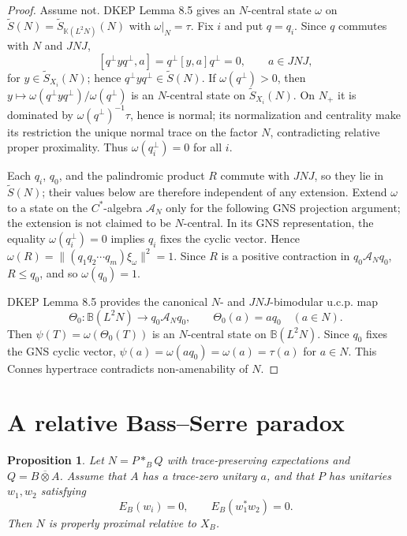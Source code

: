 \documentclass[12pt]{article}
\newtheorem{proposition}{Proposition}
\newcommand{\bbarotimes}{\mathbin{\overline{\otimes}}}
\newcommand{\cA}{\mathcal A}
\begin{document}
\begin{proof}
Assume not.  DKEP Lemma 8.5 gives an \(N\)-central state \(\omega\) on
\(\widetilde S(N)=\widetilde S_{\mathbb K(L^2N)}(N)\) with
\(\omega|_N=\tau\).  Fix \(i\) and put \(q=q_i\).  Since \(q\) commutes with
\(N\) and \(JNJ\),
\[
 [q^\perp yq^\perp,a]=q^\perp[y,a]q^\perp=0,\qquad a\in JNJ,
\]
for \(y\in\widetilde S_{X_i}(N)\); hence \(q^\perp yq^\perp\in\widetilde
S(N)\).  If \(\omega(q^\perp)>0\), then
\(y\mapsto \omega(q^\perp yq^\perp)/\omega(q^\perp)\) is an \(N\)-central state
on \(\widetilde S_{X_i}(N)\).  On \(N_+\) it is dominated by
\(\omega(q^\perp)^{-1}\tau\), hence is normal; its normalization and centrality
make its restriction the unique normal trace on the factor \(N\), contradicting
relative proper proximality.  Thus \(\omega(q_i^\perp)=0\) for all \(i\).

Each \(q_i\), \(q_0\), and the palindromic product \(R\) commute with \(JNJ\),
so they lie in \(\widetilde S(N)\); their values below are therefore independent
of any extension.  Extend \(\omega\) to a state on the \(C^*\)-algebra
\(\cA_N\) only for the following GNS projection argument; the extension is not
claimed to be \(N\)-central.  In its GNS representation, the equality
\(\omega(q_i^\perp)=0\) implies \(q_i\) fixes the cyclic vector.  Hence
\(\omega(R)=\|(q_1q_2\cdots q_m)\xi_\omega\|^2=1\).  Since \(R\) is a positive
contraction in \(q_0\cA_Nq_0\), \(R\le q_0\), and so \(\omega(q_0)=1\).

DKEP Lemma 8.5 provides the canonical \(N\)- and \(JNJ\)-bimodular u.c.p. map
\[
        \Theta_0:\mathbb B(L^2N)\to q_0\cA_Nq_0,\qquad
        \Theta_0(a)=aq_0\quad(a\in N).
\]
Then \(\psi(T)=\omega(\Theta_0(T))\) is an \(N\)-central state on
\(\mathbb B(L^2N)\).  Since \(q_0\) fixes the GNS cyclic vector,
\(\psi(a)=\omega(aq_0)=\omega(a)=\tau(a)\) for \(a\in N\).  This Connes
hypertrace contradicts non-amenability of \(N\).
\end{proof}

\section*{A relative Bass--Serre paradox}

\begin{proposition}\label{prop:BS}
Let \(N=P*_{B}Q\) with trace-preserving expectations and \(Q=B\bbarotimes A\).
Assume that \(A\) has a trace-zero unitary \(a\), and that \(P\) has unitaries
\(w_1,w_2\) satisfying
\[
        E_B(w_i)=0,\qquad E_B(w_1^*w_2)=0 .
\]
Then \(N\) is properly proximal relative to \(X_B\).
\end{proposition}
\end{document}
